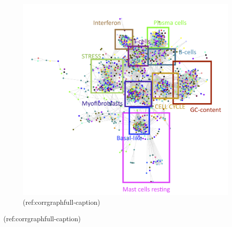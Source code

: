 \documentclass[12pt,]{book}
\theoremstyle{definition}
\theoremstyle{definition}
\theoremstyle{definition}
\theoremstyle{remark}
\begin{document}
\begin{figure}

{\centering \includegraphics[width=1\linewidth,height=0.5\textheight]{figures-ext/full_02_recip_color_annot} 

}

\caption[Correlation graph of metagenes]{(ref:corrgraphfull-caption)}\label{fig:corrgraphfull}
\end{figure}

(ref:corrgraphfull-caption)
\end{document}
